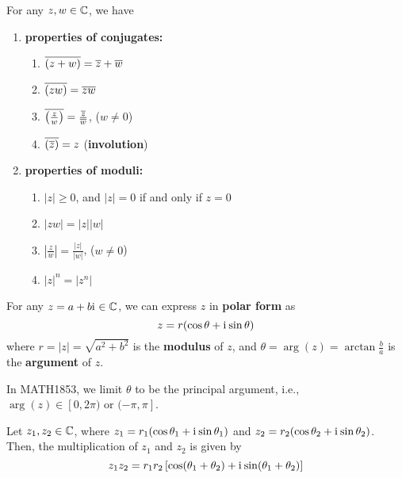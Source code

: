 \begin{theorem}
    For any $z,w\in\mathbb{C}$, we have
    \begin{enumerate}
        \item \textbf{properties of conjugates:} \begin{enumerate}
            \item $\overline{(z+w)} = \overline{z} + \overline{w}$
            \item $\overline{(zw)} = \overline{z}\overline{w}$
            \item $\overline{\left(\textstyle\frac{z}{w}\right)} = \textstyle\frac{\overline{z}}{\overline{w}}$, ($w\neq 0$)
            \item $\overline{(\overline{z})} = z$ \qquad (\textbf{involution})
        \end{enumerate}
        \item \textbf{properties of moduli:} \begin{enumerate}
            \item $|z| \geq 0$, and $|z|=0$ if and only if $z=0$
            \item $|zw| = |z||w|$
            \item $\displaystyle\left|\frac{z}{w}\right| = \frac{|z|}{|w|}$, ($w\neq 0$)
            \item $|z|^n = |z^n|$
        \end{enumerate}
    \end{enumerate}
\end{theorem}

\begin{definition}
    For any $z=a+b\mathrm{i}\mkern1mu\in\mathbb{C}$, we can express $z$ in \textbf{polar form} as
    \[
        z = r(\cos\theta + \mathrm{i}\mkern1mu\sin\theta)
    \]
    where $r=|z|=\sqrt{a^2+b^2}$ is the \textbf{modulus} of $z$,
    and $\theta=\arg(z)=\arctan\frac{b}{a}$ is the \textbf{argument} of $z$.
\end{definition}

\begin{remark}
    In MATH1853, we limit $\theta$ to be the principal argument, i.e.,
    $\arg(z)\in[0,2\pi)\text{ or }(-\pi,\pi]$.
\end{remark}

\begin{definition}
    Let $z_1, z_2\in\mathbb{C}$, where $z_1 = r_1(\cos\theta_1 + \mathrm{i}\mkern1mu\sin\theta_1)$
    and $z_2 = r_2(\cos\theta_2 + \mathrm{i}\mkern1mu\sin\theta_2)$.
    Then, the multiplication of $z_1$ and $z_2$ is given by
    \[
        z_1z_2 = r_1r_2\left[\cos(\theta_1 + \theta_2) + \mathrm{i}\mkern1mu\sin(\theta_1 + \theta_2)\right]
    \]
\end{definition}

